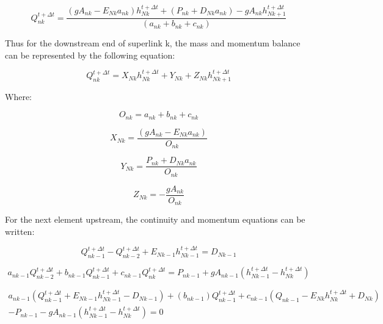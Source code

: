 \documentclass[11pt]{article}
\begin{document}
\begin{equation}
  Q_{nk}^{t + \Delta t} = \frac{( g A_{nk} -  E_{Nk} a_{nk} ) h_{Nk}^{t + \Delta t} + (P_{nk} +  D_{Nk} a_{nk}) - g A_{nk} h_{Nk + 1}^{t + \Delta t}}{(a_{nk} + b_{nk} + c_{nk})}
\end{equation}

Thus for the downstream end of superlink k, the mass and momentum balance can be
represented by the following equation:

\begin{equation}
  \boxed{
  Q_{nk}^{t + \Delta t} = X_{Nk} h_{Nk}^{t + \Delta t} + Y_{Nk} + Z_{Nk} h_{Nk + 1}^{t + \Delta t}
  }
\end{equation}

Where:

\begin{equation}
  \boxed{
  O_{nk} = a_{nk} + b_{nk} + c_{nk}
  }
\end{equation}

\begin{equation}
  \boxed{
  X_{Nk} = \frac{( g A_{nk} - E_{Nk} a_{nk} )}{O_{nk}}
  }
\end{equation}

\begin{equation}
  \boxed{
  Y_{Nk} = \frac{P_{nk} +  D_{Nk} a_{nk}}{O_{nk}}
  } 
\end{equation}

\begin{equation}
  \boxed{
  Z_{Nk} = - \frac{g A_{nk}}{O_{nk}}
  } 
\end{equation}

For the next element upstream, the continuity and momentum equations can be written:

\begin{equation}
  Q_{nk - 1}^{t + \Delta t} - Q_{nk - 2}^{t + \Delta t} + E_{Nk - 1} h_{Nk - 1}^{t + \Delta t} = D_{Nk - 1}
\end{equation}


\begin{equation}
   a_{nk - 1} Q_{nk - 2}^{t + \Delta t} + b_{nk - 1} Q_{nk - 1}^{t + \Delta t} + c_{nk - 1} Q_{nk}^{t + \Delta t} = P_{nk - 1} + g A_{nk - 1} (h_{Nk - 1}^{t + \Delta t} - h_{Nk}^{t + \Delta t})
\end{equation}

\begin{equation}
  \begin{split}
    a_{nk - 1} (Q_{nk - 1}^{t + \Delta t} + E_{Nk - 1} h_{Nk - 1}^{t + \Delta t}
    - D_{Nk - 1}) + (b_{nk - 1}) Q_{nk - 1}^{t + \Delta t} + c_{nk - 1} (Q_{nk -
      1} - E_{Nk} h_{Nk}^{t + \Delta t} + D_{Nk}) \\ - P_{nk - 1} - g A_{nk - 1}
    (h_{Nk - 1}^{t + \Delta t} - h_{Nk}^{t + \Delta t}) = 0
  \end{split}
\end{equation}
\end{document}
